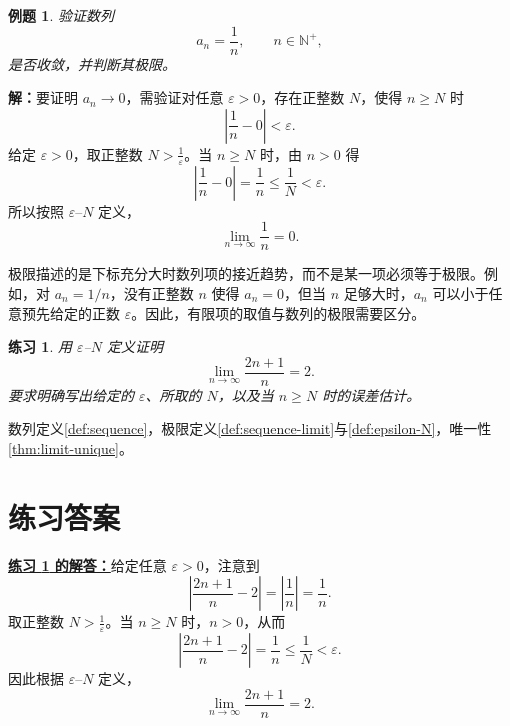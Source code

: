 \documentclass[UTF8,fontset=fandol,11pt]{ctexart}
\newtheorem{example}[definition]{例题}
\newtheorem{exercise}[definition]{练习}
\begin{document}
\begin{example}
验证数列
\[
a_n=\frac{1}{n},\qquad n\in\mathbb{N}^{+},
\]
是否收敛，并判断其极限。
\end{example}
\par\noindent\textbf{解：}要证明 $a_n\to0$，需验证对任意 $\varepsilon>0$，存在正整数 $N$，使得 $n\geq N$ 时
\[
\left|\frac{1}{n}-0\right|<\varepsilon.
\]
给定 $\varepsilon>0$，取正整数 $N>\frac{1}{\varepsilon}$。当 $n\geq N$ 时，由 $n>0$ 得
\[
\left|\frac{1}{n}-0\right|=\frac{1}{n}\leq\frac{1}{N}<\varepsilon.
\]
所以按照 $\varepsilon$--$N$ 定义，
\[
\lim_{n\to\infty}\frac{1}{n}=0.
\]\par
极限描述的是下标充分大时数列项的接近趋势，而不是某一项必须等于极限。例如，对 $a_n=1/n$，没有正整数 $n$ 使得 $a_n=0$，但当 $n$ 足够大时，$a_n$ 可以小于任意预先给定的正数 $\varepsilon$。因此，有限项的取值与数列的极限需要区分。\par
\begin{exercise}
\label{mathagent:exercise:41706b9e371cbf8283a4f1192e660b4426644ffb8f650af52f47cef5491b1ca0}
用 $\varepsilon$--$N$ 定义证明
\[
\lim_{n\to\infty}\frac{2n+1}{n}=2.
\]
要求明确写出给定的 $\varepsilon$、所取的 $N$，以及当 $n\geq N$ 时的误差估计。
\end{exercise}
数列定义\ref{def:sequence}，极限定义\ref{def:sequence-limit}与\ref{def:epsilon-N}，唯一性\ref{thm:limit-unique}。\par
\section*{练习答案}
\par\noindent\textbf{\hyperref[mathagent:exercise:41706b9e371cbf8283a4f1192e660b4426644ffb8f650af52f47cef5491b1ca0]{练习 \ref*{mathagent:exercise:41706b9e371cbf8283a4f1192e660b4426644ffb8f650af52f47cef5491b1ca0} 的解答：}}给定任意 $\varepsilon>0$，注意到
\[
\left|\frac{2n+1}{n}-2\right|=\left|\frac{1}{n}\right|=\frac{1}{n}.
\]
取正整数 $N>\frac{1}{\varepsilon}$。当 $n\geq N$ 时，$n>0$，从而
\[
\left|\frac{2n+1}{n}-2\right|=\frac{1}{n}\leq\frac{1}{N}<\varepsilon.
\]
因此根据 $\varepsilon$--$N$ 定义，
\[
\lim_{n\to\infty}\frac{2n+1}{n}=2.
\]\par
\end{document}
